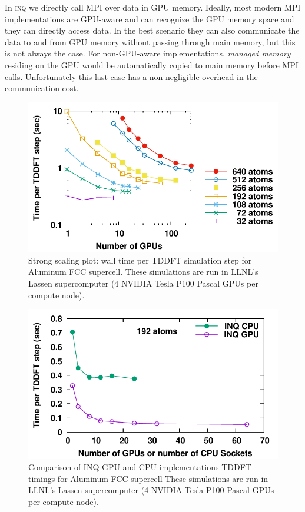 In \textsc{inq} we directly call \textsc{MPI} over data in GPU memory.
Ideally, most modern \textsc{MPI} implementations are GPU-aware and can recognize the GPU memory space and they can directly access data.
In the best scenario they can also communicate the data to and from GPU memory without passing through main memory, but this is not always the case.
For non-GPU-aware implementations, \emph{managed memory} residing on the GPU would be automatically copied to main memory before \textsc{MPI} calls.
Unfortunately this last case has a non-negligible overhead in the communication cost.

\begin{figure}[h]
	\centering
	\includegraphics[width=0.66\linewidth]{figures/scaling/strong}
	\caption{
		Strong scaling plot: wall time per TDDFT simulation step for Aluminum FCC supercell.
		These simulations are run in LLNL's Lassen supercomputer (4 NVIDIA Tesla P100 Pascal GPUs per compute node).
	}
	\label{fig:scaling_strong}
\end{figure}

\begin{figure}[h]
	\centering
	\includegraphics[width=0.66\linewidth]{figures/scaling/gpu_vs_cpu}
	\caption{
		Comparison of INQ GPU and CPU implementations TDDFT timings for Aluminum FCC supercell
		These simulations are run in LLNL's Lassen supercomputer (4 NVIDIA Tesla P100 Pascal GPUs per compute node).
	}
	\label{fig:scaling_gpu_vs_cpu}
\end{figure}

